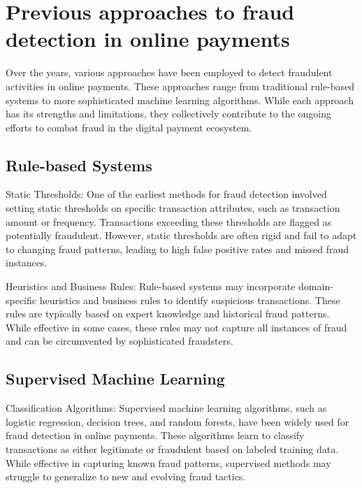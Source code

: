 \section{Previous approaches to fraud detection in online payments}
\hspace{\parindent}
Over the years, various approaches have been employed to detect fraudulent activities in online payments. These approaches range from traditional rule-based systems to more sophisticated machine learning algorithms. While each approach has its strengths and limitations, they collectively contribute to the ongoing efforts to combat fraud in the digital payment ecosystem.\\

\subsection{Rule-based Systems}
\hspace{\parindent}
Static Thresholds: One of the earliest methods for fraud detection involved setting static thresholds on specific transaction attributes, such as transaction amount or frequency. Transactions exceeding these thresholds are flagged as potentially fraudulent. However, static thresholds are often rigid and fail to adapt to changing fraud patterns, leading to high false positive rates and missed fraud instances.

Heuristics and Business Rules: Rule-based systems may incorporate domain-specific heuristics and business rules to identify suspicious transactions. These rules are typically based on expert knowledge and historical fraud patterns. While effective in some cases, these rules may not capture all instances of fraud and can be circumvented by sophisticated fraudsters.

\subsection{Supervised Machine Learning}
\hspace{\parindent}
Classification Algorithms: Supervised machine learning algorithms, such as logistic regression, decision trees, and random forests, have been widely used for fraud detection in online payments. These algorithms learn to classify transactions as either legitimate or fraudulent based on labeled training data. While effective in capturing known fraud patterns, supervised methods may struggle to generalize to new and evolving fraud tactics.

